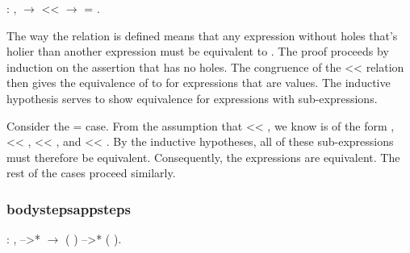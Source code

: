 \documentclass[12pt]{report}
\begin{document}
\begin{coqdoccode}
\coqdocemptyline
\coqdocindent{1.00em}
  : \coqdockw{\ensuremath{\forall}}  ,\coqdoceol
\coqdocindent{2.00em}
  \ensuremath{\rightarrow}\coqdoceol
\coqdocindent{2.00em}
 <<  \ensuremath{\rightarrow}\coqdoceol
\coqdocindent{2.00em}
 = .\coqdoceol
\coqdocemptyline
\end{coqdoccode}

The way the  relation is defined means that any
expression without holes  that's holier than another
expression  must be equivalent to .  The
proof proceeds by induction on the assertion that  has
no holes. The congruence of the << relation then gives the
equivalence of  to  for expressions that
are values.  The inductive hypothesis serves to show equivalence for
expressions with sub-expressions. 

Consider the  =  
  case. From the
assumption that   
 << , we know  is of the
form   
,  << ,
 << , and  <<
. By the inductive hypotheses, all of these
sub-expressions must therefore be equivalent. Consequently, the
 expressions are equivalent. The rest of the cases
proceed similarly. 

\subsubsection{bodystepsappsteps}

\begin{coqdoccode}
\coqdocemptyline
\coqdocindent{1.00em}
  : \coqdockw{\ensuremath{\forall}}   ,\coqdoceol
\coqdocindent{2.00em}
 -->*  \ensuremath{\rightarrow}\coqdoceol
\coqdocindent{2.00em}
(  ) -->* (  ).\coqdoceol
\coqdocemptyline
\end{coqdoccode}
\end{document}
